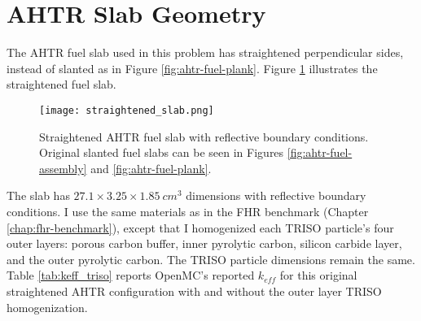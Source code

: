 \section{AHTR Slab Geometry}
The \gls{AHTR} fuel slab used in this problem has straightened perpendicular 
sides, instead of slanted as in Figure \ref{fig:ahtr-fuel-plank}. 
Figure \ref{fig:straightened_slab} illustrates the straightened fuel slab.
\begin{figure}[H]
    \centering
    \texttt{[image: straightened\_slab.png]}
    \raggedright
    \caption{Straightened \acrfull{AHTR} fuel slab with reflective boundary 
    conditions. Original slanted fuel slabs can be seen in Figures 
    \ref{fig:ahtr-fuel-assembly} and \ref{fig:ahtr-fuel-plank}.}
    \label{fig:straightened_slab}
\end{figure}
The slab has $27.1 \times 3.25 \times 1.85\ cm^3$ dimensions with reflective 
boundary conditions.
I use the same materials as in the \gls{FHR} benchmark (Chapter \ref{chap:fhr-benchmark}), 
except that I homogenized each \gls{TRISO} particle's four outer layers: 
porous carbon buffer, inner pyrolytic carbon, silicon carbide layer, and the 
outer pyrolytic carbon. 
The \gls{TRISO} particle dimensions remain the same.
Table \ref{tab:keff_triso} reports OpenMC's reported $k_{eff}$ for this original 
straightened \gls{AHTR} configuration with and without the outer layer \gls{TRISO} 
homogenization.
